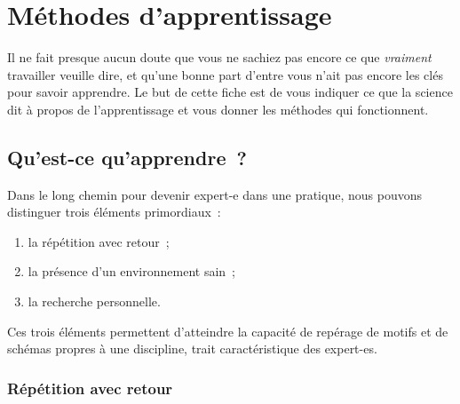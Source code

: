 \documentclass[a4paper, 12pt, garamond]{book}
\begin{document}
\setcounter{chapter}{0}

\chapter{Méthodes d'apprentissage}

Il ne fait presque aucun doute que vous ne sachiez pas encore ce que
\textit{vraiment} travailler veuille dire, et qu'une bonne part d'entre vous
n'ait pas encore les clés pour savoir apprendre. Le but de cette fiche est de
vous indiquer ce que la science dit à propos de l'apprentissage et vous donner
les méthodes qui fonctionnent.

\section{Qu'est-ce qu'apprendre~?}



Dans le long chemin pour devenir expert-e dans une pratique, nous pouvons
distinguer trois éléments primordiaux~:
\begin{enumerate}
	\item la répétition avec retour~;
	\item la présence d'un environnement sain~;
	\item la recherche personnelle.
\end{enumerate}

Ces trois éléments permettent d'atteindre la capacité de repérage de motifs et
de schémas propres à une discipline, trait caractéristique des expert-es.


\subsection{Répétition avec retour}
\end{document}
